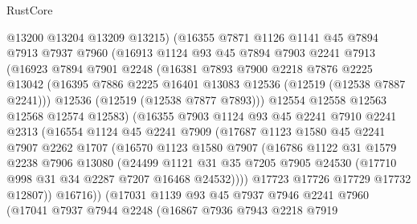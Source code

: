 \begin{lexlean}{RustCore}
\begin{coremodule}
            @13200
            @13204
            @13209
            @13215)
          (@16355
            @7871
            @1126
            @1141
            @45
            @7894
            @7913
            @7937
            @7960
            (@16913
              @1124
              @93
              @45
              @7894
              @7903
              @2241
              @7913
              (@16923
                @7894
                @7901
                @2248
                (@16381
                  @7893
                  @7900
                  @2218
                  @7876
                  @2225
                  @13042
                  (@16395 @7886 @2225 @16401 @13083 @12536 (@12519 (@12538 @7887 @2241)))
                  @12536
                  (@12519 (@12538 @7877 @7893)))
                @12554
                @12558
                @12563
                @12568
                @12574
                @12583)
              (@16355
                @7903
                @1124
                @93
                @45
                @2241
                @7910
                @2241
                @2313
                (@16554
                  @1124
                  @45
                  @2241
                  @7909
                  (@17687
                    @1123
                    @1580
                    @45
                    @2241
                    @7907
                    @2262
                    @1707
                    (@16570
                      @1123
                      @1580
                      @7907
                      (@16786
                        @1122
                        @31
                        @1579
                        @2238
                        @7906
                        @13080
                        (@24499
                          @1121
                          @31
                          @35
                          @7205
                          @7905
                          @24530
                          (@17710 @998 @31 @34 @2287 @7207 @16468 @24532))))
                    @17723
                    @17726
                    @17729
                    @17732
                    @12807))
                @16716))
            (@17031
              @1139
              @93
              @45
              @7937
              @7946
              @2241
              @7960
              (@17041
                @7937
                @7944
                @2248
                (@16867
                  @7936
                  @7943
                  @2218
                  @7919

\end{coremodule}
\end{lexlean}
